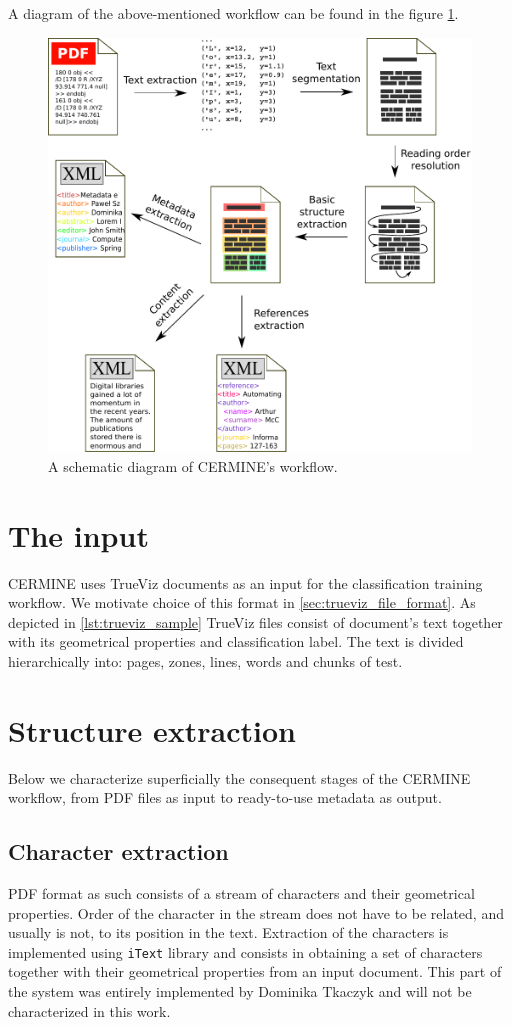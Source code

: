 A diagram of the above-mentioned workflow can be found in the figure \ref{fig:pipeline}.
\begin{figure}[ht!]
  \centering
  \includegraphics[width=14cm]{graphics/pipeline}
  \caption{A schematic diagram of CERMINE's workflow.}
  \label{fig:pipeline}
\end{figure}

\section{The input}
CERMINE uses TrueViz documents as an input for the classification training workflow. We motivate choice of this format in \ref{sec:trueviz_file_format}. As depicted in \ref{lst:trueviz_sample} TrueViz files consist of document's text together with its geometrical properties and classification label. The text is divided hierarchically into: pages, zones, lines, words and chunks of test. 

\section{Structure extraction}
Below we characterize superficially the consequent stages of the CERMINE workflow, from PDF files as input to ready-to-use metadata as output.

\subsection{Character extraction}\label{sec:character_extraction}
PDF format as such consists of a stream of characters and their geometrical properties. Order of the character in the stream does not have to be related, and usually is not, to its position in the text. Extraction of the characters is implemented using \verb+iText+ library and consists in obtaining a set of characters together with their geometrical properties from an input document. This part of the system was entirely implemented by Dominika Tkaczyk and will not be characterized in this work.

